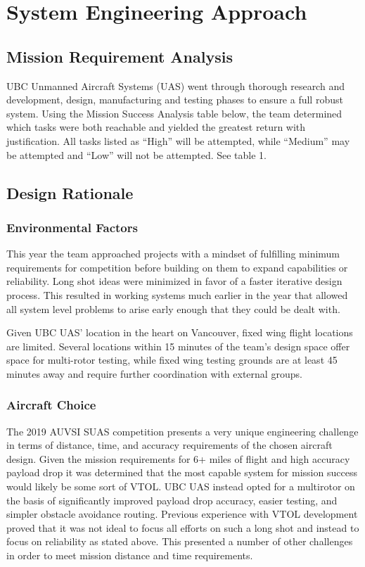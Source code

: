 \twocolumn
\section{System Engineering Approach}
\label{sec1:introduction}

\subsection{Mission Requirement Analysis}
UBC Unmanned Aircraft Systems (UAS) went through thorough research and development, design, manufacturing and testing phases to ensure a full robust system. Using the Mission Success Analysis table below, the team determined which tasks were both reachable and yielded the greatest return with justification. All tasks listed as “High” will be attempted, while “Medium” may be attempted and “Low” will not be attempted. See table 1.


\subsection{Design Rationale}
    \subsubsection{Environmental Factors}

     This year the team approached projects with a mindset of fulfilling minimum requirements for competition before building on them to expand capabilities or reliability. Long shot ideas were minimized in favor of a faster iterative design process. This resulted in working systems much earlier in the year that allowed all system level problems to arise early enough that they could be dealt with.

    Given UBC UAS’ location in the heart on Vancouver, fixed wing flight locations are limited. Several locations within 15 minutes of the team’s design space offer space for multi-rotor testing, while fixed wing testing grounds are at least 45 minutes away and require further coordination with external groups. 
    
    \subsubsection{Aircraft Choice}
    The 2019 AUVSI SUAS competition presents a very unique engineering challenge in terms of distance, time, and accuracy requirements of the chosen aircraft design. Given the mission requirements for 6+ miles of flight and high accuracy payload drop it was determined that the most capable system for mission success would likely be some sort of VTOL. UBC UAS instead opted for a multirotor on the basis of significantly improved payload drop accuracy, easier testing, and simpler obstacle avoidance routing. Previous experience with VTOL development proved that it was not ideal to focus all efforts on such a long shot and instead to focus on reliability as stated above. This presented a number of other challenges in order to meet mission distance and time requirements. 


